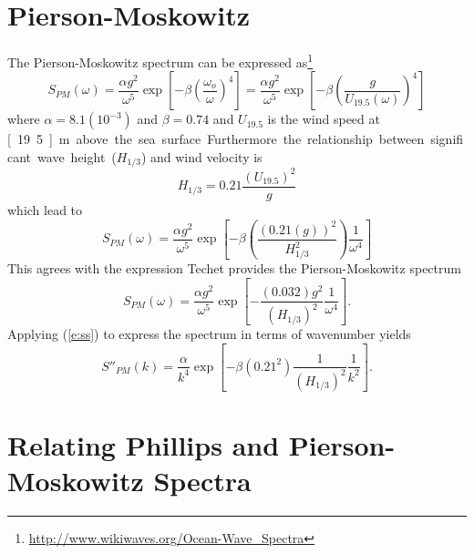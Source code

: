 \documentclass[11pt]{article}
\begin{document}
\section{Pierson-Moskowitz}
The Pierson-Moskowitz spectrum can be expressed as\footnote{\url{http://www.wikiwaves.org/Ocean-Wave_Spectra}}
\begin{equation}
S_{PM}(\omega)=\frac{\alpha g^2}{\omega^5} \exp{\left[ -\beta \left(\frac{\omega_o}{\omega}\right)^4 \right]} =\frac{\alpha g^2}{\omega^5} \exp{\left[ -\beta \left(\frac{g}{U_{19.5}(\omega)}\right)^4 \right]}
\end{equation}
where $\alpha=8.1(10^{-3})$ and $\beta=0.74$ and $U_{19.5}$ is the wind speed at \unit[19.5]{m} above the sea surface.  Furthermore the relationship between significant wave height ($H_{1/3}$) and wind velocity is
\begin{equation}
H_{1/3} = 0.21 \frac{\left(U_{19.5}\right)^2}{g}
\end{equation}
which lead to 
\begin{equation}
S_{PM}(\omega)=\frac{\alpha g^2}{\omega^5} \exp{\left[ -\beta \left(\frac{(0.21(g))^2}{H_{1/3}^2}\right) \frac{1}{\omega^4} \right]}
\end{equation}
This agrees with the expression Techet provides the Pierson-Moskowitz spectrum 
\begin{equation}
S_{PM}(\omega)=\frac{\alpha g^2}{\omega^5} \exp{\left[ - \frac{(0.032)g^2}{\left(H_{1/3}\right)^2} \frac{1}{\omega^4} \right]}.
\end{equation} 
Applying (\ref{e:ss}) to express the spectrum in terms of wavenumber yields
\begin{equation}
S''_{PM}(k) = \frac{\alpha}{k^4} \exp{\left[ -\beta (0.21^2) \frac{1}{(H_{1/3})^2}\frac{1}{k^2} \right]}.
\end{equation}

\section{Relating Phillips and Pierson-Moskowitz Spectra}

\newpage
\setcounter{page}{1}


\end{document}
